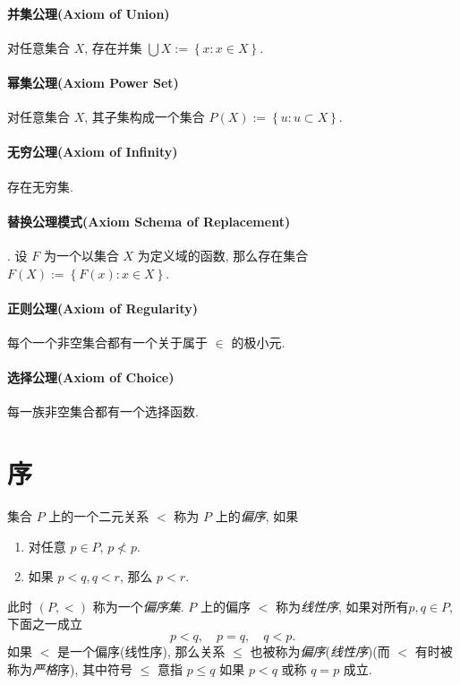 \paragraph{并集公理(Axiom of Union)} 对任意集合 \( X \), 存在并集 \( \bigcup X
:= \left\lbrace x: x \in X \right\rbrace \).

\paragraph{幂集公理(Axiom Power Set)} 对任意集合 \( X \), 其子集构成一个集合 \(
P(X) := \left\lbrace u: u \subset X\right\rbrace \).

\paragraph{无穷公理(Axiom of Infinity)} 存在无穷集.

\paragraph{替换公理模式(Axiom Schema of Replacement)}. 设 \( F \) 为一个以集合
\( X \) 为定义域的函数, 那么存在集合 \( F(X) := \left\lbrace F(x) : x \in X
\right\rbrace \).

\paragraph{正则公理(Axiom of Regularity)} 每个一个非空集合都有一个关于属于 \(
\in \) 的极小元.

\paragraph{选择公理(Axiom of Choice)} 每一族非空集合都有一个选择函数.

\section{序}

集合 \( P \) 上的一个二元关系 \( < \) 称为 \( P \) 上的\emph{偏序}, 如果
\begin{enumerate}
  \item 对任意 \( p \in P \), \( p \not< p \).
  \item 如果 \( p < q, q < r \), 那么 \( p < r \).
\end{enumerate}
此时 \( (P, <) \) 称为一个\emph{偏序集}.
\( P \) 上的偏序 \( < \) 称为\emph{线性序}, 如果对所有\( p, q \in P \),
下面之一成立
\[
  p < q,\quad p = q,\quad q < p.
\]
如果 \( < \) 是一个偏序(线性序), 那么关系 \( \leq \)
也被称为\emph{偏序}(\emph{线性序})(而 \( < \) 有时被称为\emph{严格}序), 其中符号
\( \leq \) 意指 \( p \leq q \) 如果 \( p < q \) 或称 \( q = p \) 成立.

